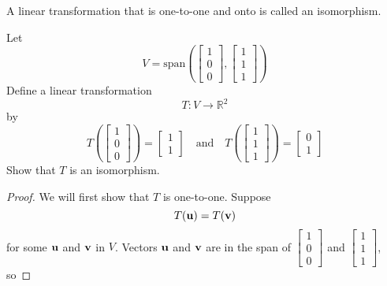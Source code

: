 \documentclass{ximera}
\renewcommand{\vec}[1]{{\bf #1}}
\newcommand{\RR}{\mathbb{R}}
\begin{document}
\begin{definition} A linear transformation that is one-to-one and onto is called an isomorphism.
\end{definition}

\begin{example}\label{ex:subtosub} Let $$V=\text{span}\left(\begin{bmatrix}1\\0\\0\end{bmatrix}, \begin{bmatrix}1\\1\\1\end{bmatrix}\right)$$
Define a linear transformation $$T:V\rightarrow \RR^2$$
by $$T\left(\begin{bmatrix}1\\0\\0\end{bmatrix}\right)=\begin{bmatrix}1\\1\end{bmatrix}\quad \text{and} \quad T\left(\begin{bmatrix}1\\1\\1\end{bmatrix}\right)=\begin{bmatrix}0\\1\end{bmatrix}$$
Show that $T$ is an isomorphism.
\begin{proof}

We will first show that $T$ is one-to-one.  
Suppose 
$$T(\vec{u})=T(\vec{v})$$
for some $\vec{u}$ and $\vec{v}$ in $V$. Vectors $\vec{u}$ and $\vec{v}$ are in the span of $\begin{bmatrix}1\\0\\0\end{bmatrix}$ and $\begin{bmatrix}1\\1\\1\end{bmatrix}$, so


\end{proof}
\end{example}
\end{document}
